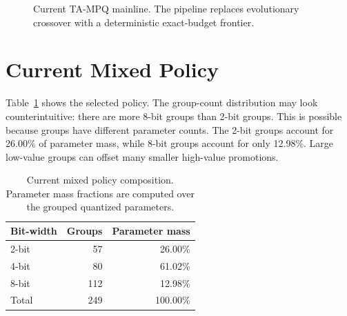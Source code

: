 \documentclass{article}
\newcommand{\method}{TA-MPQ}
\begin{document}
\begin{figure}[t]
\centering
{}
\caption{Current \method{} mainline. The pipeline replaces evolutionary crossover with a deterministic exact-budget frontier.}
\label{fig:pipeline}
\end{figure}

\section{Current Mixed Policy}

Table~\ref{tab:policy} shows the selected policy. The group-count distribution may look counterintuitive: there are more 8-bit groups than 2-bit groups. This is possible because groups have different parameter counts. The 2-bit groups account for 26.00\% of parameter mass, while 8-bit groups account for only 12.98\%. Large low-value groups can offset many smaller high-value promotions.

\begin{table}[t]
\caption{Current mixed policy composition. Parameter mass fractions are computed over the grouped quantized parameters.}
\label{tab:policy}
\centering
\begin{tabular}{lrr}
\toprule
Bit-width & Groups & Parameter mass \\
\midrule
2-bit & 57 & 26.00\% \\
4-bit & 80 & 61.02\% \\
8-bit & 112 & 12.98\% \\
\midrule
Total & 249 & 100.00\% \\
\bottomrule
\end{tabular}
\end{table}
\end{document}
